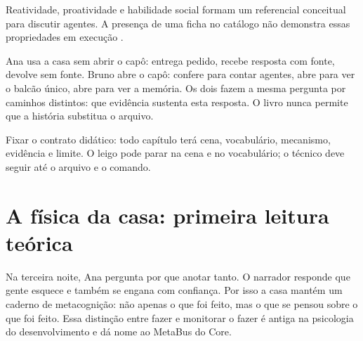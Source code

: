 Reatividade, proatividade e habilidade social formam um referencial conceitual para discutir agentes. A presen\c{c}a de uma ficha no cat\'alogo n\~ao demonstra essas propriedades em execu\c{c}\~ao .


\begin{descricao}
Ana usa a casa sem abrir o cap\^o: entrega pedido, recebe resposta com fonte, devolve sem fonte. Bruno abre o cap\^o: confere  para contar agentes, abre  para ver o balc\~ao \'unico, abre  para ver a mem\'oria. Os dois fazem a mesma pergunta por caminhos distintos: que evid\^encia sustenta esta resposta. O livro nunca permite que a hist\'oria substitua o arquivo.
\end{descricao}

\begin{funcao}
Fixar o contrato did\'atico: todo cap\'itulo ter\'a cena, vocabul\'ario, mecanismo, evid\^encia e limite. O leigo pode parar na cena e no vocabul\'ario; o t\'ecnico deve seguir at\'e o arquivo e o comando.
\end{funcao}

\section{A f\'isica da casa: primeira leitura te\'orica}

Na terceira noite, Ana pergunta por que anotar tanto. O narrador responde que gente esquece e tamb\'em se engana com confian\c{c}a. Por isso a casa mant\'em um caderno de metacogni\c{c}\~ao: n\~ao apenas o que foi feito, mas o que se pensou sobre o que foi feito. Essa distin\c{c}\~ao entre fazer e monitorar o fazer \'e antiga na psicologia do desenvolvimento e d\'a nome ao MetaBus do Core.

